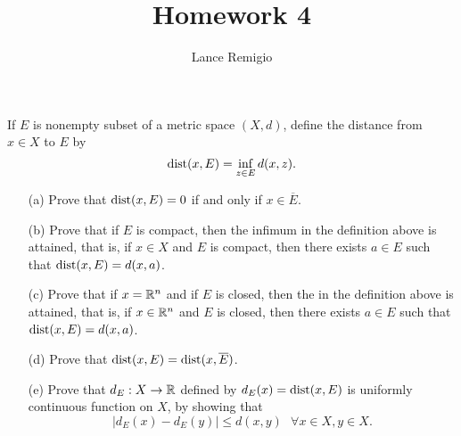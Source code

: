 \documentclass[a4paper]{article}
\title{Homework 4}
\author{Lance Remigio}
\begin{document}
\maketitle

\begin{problem}
   If \( E  \) is nonempty subset of a metric space \( (X,d) \), define the distance from \( x \in X  \) to \( E  \) by 
   \[  \operatorname{dist}(x,E) = \inf_{z \in E } d(x,z). \]
   \begin{enumerate}
       \item[(a)] Prove that \( \operatorname{dist} (x,E) = 0  \) if and only if \( x \in \overline{E} \).
      \item[(b)] Prove that if \( E  \) is compact, then the infimum in the definition above is attained, that is, if \( x \in X  \) and \( E  \) is compact, then there exists \( a \in E  \) such that \( \operatorname{dist} (x,E ) = d(x,a) \).
      \item[(c)] Prove that if \( x = \mathbb{R}^{n} \) and if \( E  \) is closed, then the in the definition above is attained, that is, if \( x \in \mathbb{R}^{n} \) and \( E  \) is closed, then there exists \( a \in E  \) such that \( \operatorname{dist} (x,E) = d(x,a) \).
        \item[(d)] Prove that \( \operatorname{dist}(x,E) = \operatorname{dist} (x, \overline{E}) \).
        \item[(e)] Prove that \( {d}_{E} : X \to \mathbb{R}  \) defined by \( {d}_{E} (x) = \operatorname{dist} (x,E) \) is uniformly continuous function on \( X  \), by showing that 
            \[  | {d}_{E}(x) - {d}_{E}(y) |  \leq d(x,y) \ \ \ \forall x \in X , y \in X. \]
   \end{enumerate} 
\end{problem}
\end{document}
